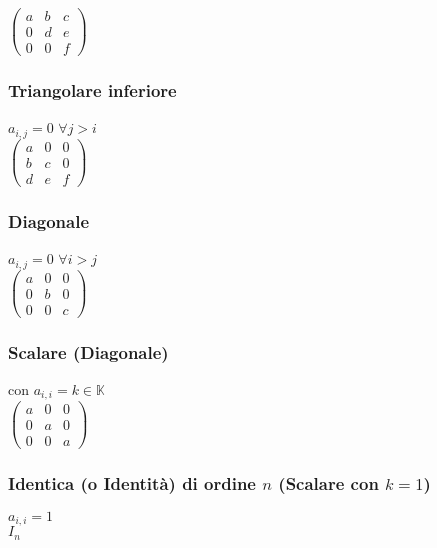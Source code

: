 \documentclass[a4paper, twoside, italian, 11pt]{book}
\newcommand{\K}{\mathbb{K}}
\begin{document}
\noindent
$\begin{pmatrix}
a & b & c \\
0 & d & e \\
0 & 0 & f
\end{pmatrix}$


\subsubsection{Triangolare inferiore}

$a_{i,j} = 0$ $\forall j > i$ \\

\noindent
$\begin{pmatrix}
a & 0 & 0 \\
b & c & 0 \\
d & e & f
\end{pmatrix}$


\subsubsection{Diagonale}

$a_{i,j} = 0$ $\forall i > j$ \\

\noindent
$\begin{pmatrix}
a & 0 & 0 \\
0 & b & 0 \\
0 & 0 & c
\end{pmatrix}$


\subsubsection{Scalare (Diagonale)}

con $a_{i,i} = k \in \K$ \\

\noindent
$\begin{pmatrix}
a & 0 & 0 \\
0 & a & 0 \\
0 & 0 & a
\end{pmatrix}$


\subsubsection{Identica (o Identità) di ordine $n$ (Scalare con $k = 1$)}

$a_{i,i} = 1$ \\

\noindent
$I_n$ \\
\end{document}
